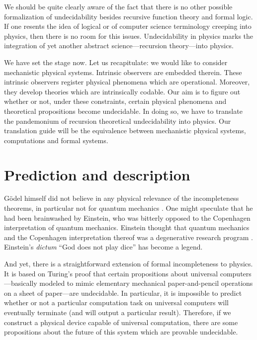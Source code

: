 We should be quite clearly aware of the fact that there is
no other possible formalization
of undecidability besides recursive function theory and formal logic. If
one resents the idea of logical or  of computer science
terminology creeping into physics, then there is no room for this
issues. Undecidability in physics marks the integration of yet another
abstract science---recursion theory---into physics.


We have set the stage now.
Let us recapitulate: we would like to consider mechanistic physical
systems.
Intrinsic observers are embedded therein. These intrinsic observers
register
physical phenomena which are operational. Moreover, they develop
theories which are intrinsically codable.
Our aim is to figure out whether or not, under these constraints,
certain
physical phenomena and theoretical propositions become undecidable.
In doing so, we have to translate the pandemonium of recursion
theoretical undecidability into physics. Our translation
guide will be the equivalence between mechanistic physical systems,
computations and formal systems.



\section{Prediction and description}
G\"odel himself did not believe in any physical relevance of the
incompleteness theorems, in particular not for quantum mechanics
\cite{bernstein}.
One might speculate that
he had been brainwashed
by Einstein, who was bitterly opposed to the Copenhagen interpretation
of quantum mechanics. Einstein thought that
quantum
mechanics and the Copenhagen interpretation thereof was a
degenerative research program \cite{wheeler-Zurek:83,jammer}.
Einstein's
{\em dictum} ``God does not play dice'' has become a legend.

And yet, there is a straightforward extension of formal
incompleteness to
physics.
It is based on Turing's proof that certain propositions about
universal
computers---basically modeled to mimic elementary mechanical
paper-and-pencil operations on a sheet of paper---are undecidable.
In particular, it is impossible to predict
whether or
not a particular computation task on universal computers  will
eventually terminate
(and will output a particular result).
Therefore, if we construct a physical device capable of universal
computation,
there are some propositions about the future of this system which
are provable undecidable.

